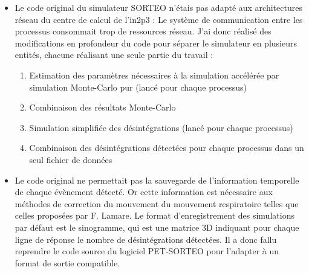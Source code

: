 \begin{itemize}
    \item Le code original du simulateur SORTEO n'étais pas adapté aux architectures réseau du centre de calcul de l'in2p3 : Le système de communication entre les processus consommait trop de ressources réseau. J'ai donc réalisé des modifications en profondeur du code pour séparer le simulateur en plusieurs entités, chacune réalisant une seule partie du travail :

    \begin{enumerate}
        \item Estimation des paramètres nécessaires à la simulation accélérée par simulation Monte-Carlo pur (lancé pour chaque processus)
        \item Combinaison des résultats Monte-Carlo
        \item Simulation simplifiée des désintégrations (lancé pour chaque processus)
        \item Combinaison des désintégrations détectées pour chaque processus dans un seul fichier de données
    \end{enumerate}

    \item Le code original ne permettait pas la sauvegarde de l'information temporelle de chaque évènement détecté. Or cette information est nécessaire aux méthodes de correction du mouvement du mouvement respiratoire telles que celles proposées par F. Lamare. Le format d'enregistrement des simulations par défaut est le sinogramme, qui est une matrice 3D indiquant pour chaque ligne de réponse le nombre de désintégrations détectées. Il a donc fallu reprendre le code source du logiciel PET-SORTEO pour l'adapter à un format de sortie compatible. 
\end{itemize}
